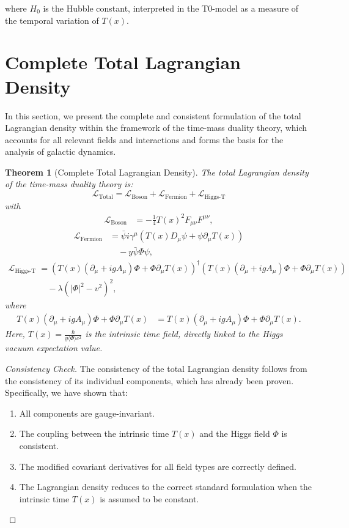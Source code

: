 \documentclass[a4paper,12pt]{article}
\newtheorem{theorem}{Theorem}
\newcommand{\Tfield}{T(x)}
\newcommand{\DhiggsTdef}{\Tfield (\partial_\mu + ig A_\mu) \Phi + \Phi \partial_\mu \Tfield}
\begin{document}
	where \( H_0 \) is the Hubble constant, interpreted in the T0-model as a measure of the temporal variation of \( \Tfield \).
	
	\section{Complete Total Lagrangian Density}
	
	In this section, we present the complete and consistent formulation of the total Lagrangian density within the framework of the time-mass duality theory, which accounts for all relevant fields and interactions and forms the basis for the analysis of galactic dynamics.
	
	\begin{theorem}[Complete Total Lagrangian Density]
		The total Lagrangian density of the time-mass duality theory is:
		\[
		\mathcal{L}_{\text{Total}} = \mathcal{L}_{\text{Boson}} + \mathcal{L}_{\text{Fermion}} + \mathcal{L}_{\text{Higgs-T}}
		\]
		with
		\begin{align*}
			\mathcal{L}_{\text{Boson}} &= -\frac{1}{4} \Tfield^2 F_{\mu\nu} F^{\mu\nu},
		\end{align*}
		\begin{align*}
			\mathcal{L}_{\text{Fermion}} &= \bar{\psi} i \gamma^\mu \left( \Tfield D_\mu \psi + \psi \partial_\mu \Tfield \right) \\
			&\quad - y \bar{\psi} \Phi \psi,
		\end{align*}
		\begin{align*}
			\mathcal{L}_{\text{Higgs-T}} &= \left( \DhiggsTdef \right)^\dagger \left( \DhiggsTdef \right) \\
			&\quad - \lambda (|\Phi|^2 - v^2)^2,
		\end{align*}
		where
		\begin{align*}
			\DhiggsTdef &= \Tfield (\partial_\mu + ig A_\mu) \Phi + \Phi \partial_\mu \Tfield.
		\end{align*}
		Here, \( \Tfield = \frac{\hbar}{y \langle \Phi \rangle c^2} \) is the intrinsic time field, directly linked to the Higgs vacuum expectation value.
	\end{theorem}
	
	\begin{proof}[Consistency Check]
		The consistency of the total Lagrangian density follows from the consistency of its individual components, which has already been proven. Specifically, we have shown that:
		\begin{enumerate}
			\item All components are gauge-invariant.
			\item The coupling between the intrinsic time \( \Tfield \) and the Higgs field \( \Phi \) is consistent.
			\item The modified covariant derivatives for all field types are correctly defined.
			\item The Lagrangian density reduces to the correct standard formulation when the intrinsic time \( \Tfield \) is assumed to be constant.
		\end{enumerate}
	\end{proof}
	
\end{document}
